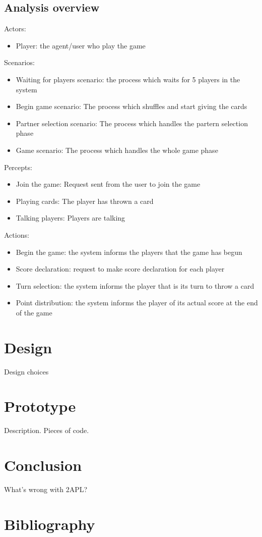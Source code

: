 \documentclass[a4paper]{article}
\begin{document}
\subsection{Analysis overview}

Actors:
\begin{itemize}
  \item Player: the agent/user who play the game
\end{itemize}

Scenarios:
\begin{itemize}
  \item Waiting for players scenario: the process which waits for 5 players in the system
  \item Begin game scenario: The process which shuffles and start giving the cards
  \item Partner selection scenario: The process which handles the partern selection phase
  \item Game scenario: The process which handles the whole game phase
\end{itemize}

Percepts:
\begin{itemize}
  \item Join the game: Request sent from the user to join the game
  \item Playing cards: The player has thrown a card
  \item Talking players:  Players are talking
\end{itemize}

Actions:
\begin{itemize}
  \item Begin the game: the system informs the players that the game has begun
  \item Score declaration: request to make score declaration for each player
  \item Turn selection: the system informs the player that is its turn to throw a card
  \item Point distribution: the system informs the player of its actual score at the end of the game
\end{itemize}


\section{Design}\label{sec:design} 

Design choices

\section{Prototype}\label{sec:proto} 

Description. Pieces of code.

\section{Conclusion}\label{sec:concl} 

What's wrong with 2APL?

\section{Bibliography}
\nocite{*}


\end{document}
